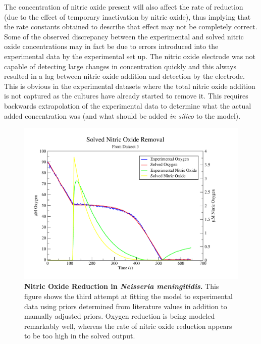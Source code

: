 The concentration of nitric oxide present will also affect the rate of \cbbthree{} reduction (due to the effect of temporary inactivation by nitric oxide), thus implying that the rate constants obtained to describe that effect may not be completely correct. Some of the observed discrepancy between the experimental and solved nitric oxide concentrations may in fact be due to errors introduced into the experimental data by the experimental set up. The nitric oxide electrode was not capable of detecting large changes in concentration quickly and this always resulted in a lag between nitric oxide addition and detection by the electrode. This is obvious in the experimental datasets where the total nitric oxide addition is not captured as the cultures have already started to remove it. This requires backwards extrapolation of the experimental data to determine what the actual added concentration was (and what should be added \textit{in silico} to the model).

\begin{figure}[tbp]
 \centering
 \includegraphics[width=15cm, trim=1cm 1cm 3cm 1cm, clip=true]{./06-noreduction/data/aer-no-sim3-1.pdf}
 \caption[{Nitric Oxide Reduction in \textit{Neisseria meningitidis}.}]{{\bf Nitric Oxide Reduction in \textit{Neisseria meningitidis}.} This figure shows the third attempt at fitting the model to experimental data using priors determined from literature values in addition to manually adjusted priors. Oxygen reduction is being modeled remarkably well, whereas the rate of nitric oxide reduction appears to be too high in the solved output.}
 \label{fig:nosim3.2}
\end{figure}

